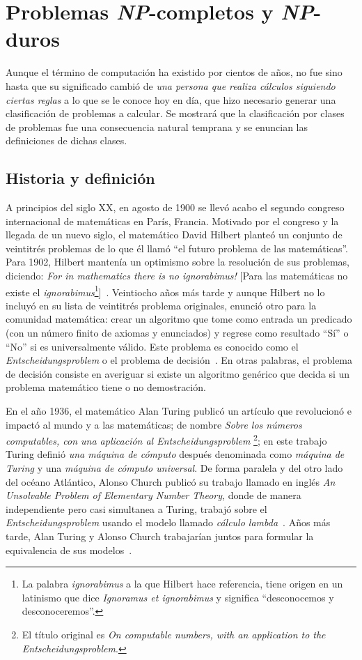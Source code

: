 \chapter{Problemas \textsl{NP}-completos y \textsl{NP}-duros}

Aunque el término de computación ha existido por cientos 
de años, no fue sino hasta que su significado cambió de \textit{una persona que 
realiza cálculos siguiendo ciertas reglas} a lo que se le conoce hoy en día, 
que hizo necesario generar una clasificación de problemas a calcular. 
Se mostrará que la clasificación por clases de problemas fue una consecuencia 
natural temprana y se enuncian las definiciones de dichas clases.

\section{Historia y definición}
\label{sec:np-def}

A principios del siglo XX, en agosto de 1900 se llevó acabo el segundo
congreso internacional de matemáticas en París, Francia.
Motivado por el congreso y la llegada de un nuevo siglo, el matemático
David Hilbert planteó un conjunto de veintitrés problemas de lo que él llamó
``el futuro problema de las matemáticas''.
Para 1902, Hilbert mantenía un optimismo sobre la resolución de sus problemas,
diciendo: \textit{For in mathematics there is no ignorabimus!} [Para las matemáticas
no existe el \emph{ignorabimus}\footnote{La palabra \textit{ignorabimus} a la que
Hilbert hace referencia, tiene origen en un latinismo que dice
\textit{Ignoramus et ignorabimus} y significa  ``desconocemos y
desconoceremos''.}]~\cite{Grattan-Guinness}. Veintiocho años más tarde y aunque
Hilbert no lo incluyó en su lista de veintitrés problema originales, enunció
otro para la comunidad matemática: crear un algoritmo que tome como entrada
un predicado (con un número finito de axiomas y enunciados) y regrese como
resultado ``Sí'' o ``No'' si es universalmente válido. Este problema es conocido
como el \textit{Entscheidungsproblem} o el problema de
decisión~\cite{hilbert1950principles}. En otras palabras, el problema de
decisión consiste en averiguar si existe un algoritmo genérico que decida
si un problema matemático tiene o no demostración.

En el año 1936, el matemático Alan Turing publicó un artículo que
revolucionó e impactó al mundo y a las matemáticas; de nombre \textit{
Sobre los números computables, con una aplicación al Entscheidungsproblem}
\footnote{El título original es \textit{On computable numbers, with an
application to the Entscheidungsproblem}.}; en este trabajo Turing
definió \textit{una máquina de cómputo} después denominada como \textit{
máquina de Turing} y una \textit{máquina de cómputo universal}. De forma
paralela y del otro lado del océano Atlántico, Alonso Church publicó su trabajo
llamado en inglés \textit{An Unsolvable Problem of Elementary Number Theory},
donde de manera independiente pero casi simultanea a Turing, trabajó sobre
el \emph{Entscheidungsproblem} usando el modelo llamado \textit{cálculo
lambda}~\cite{church1935unsolvable}. Años más tarde, Alan Turing y Alonso Church
trabajarían juntos para formular la equivalencia de sus modelos~\cite{sep-church-turing}.

